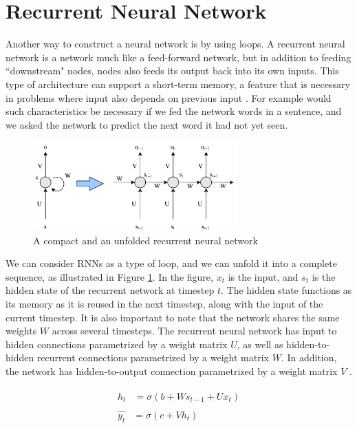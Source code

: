 
\section{Recurrent Neural Network}
Another way to construct a neural network is by using loops. A recurrent neural network \citep{rumelhart1988learning} is a network much like a feed-forward network, but in addition to feeding ``downstream" nodes, nodes also feeds its output back into its own inputs. This type of architecture can support a short-term memory, a feature that is necessary in problems where input also depends on previous input \citep{russell2010aimodernapproach}. For example would such characteristics be necessary if we fed the network words in a sentence, and we asked the network to predict the next word it had not yet seen.

\begin{figure}[ht]
    \centering
    \includegraphics[width=0.7\textwidth]{fig/related_work/nn_recurrent.pdf}
    \caption{A compact and an unfolded recurrent neural network}
    \label{fig:nn-rnn}
\end{figure}

We can consider RNNs as a type of loop, and we can unfold it into a complete sequence, as illustrated in Figure \ref{fig:nn-rnn}. In the figure, \(x_{t}\) is the input, and \(s_{t}\) is the hidden state of the recurrent network at timestep \(t\). The hidden state functions as its memory as it is reused in the next timestep, along with the input of the current timestep. It is also important to note that the network shares the same weights \(W\) across several timesteps. The recurrent neural network has input to hidden connections parametrized by a weight matrix \(U\), as well as hidden-to-hidden recurrent connections parametrized by a weight matrix \(W\). In addition, the network has hidden-to-output connection parametrized by a weight matrix \(V\) \citep{goodfellow2016deeplearning}.

\begin{align}
    \begin{split}\label{eq:rnn-eq-1}
        h_{t}&=\sigma(b+Ws_{t-1}+Ux_{t})
    \end{split}\\
    \begin{split}\label{eq:rnn-eq-2}
        \hat{y_{t}}&=\sigma(c+Vh_{t})
    \end{split}
\end{align}

